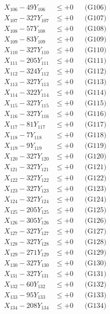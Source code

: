 \documentclass[a4paper,10pt]{article}
\begin{document}
{\begin{align}
X_{106} - 49Y_{106} &\leq +0 && \text{(G106)} \\
X_{107} - 327Y_{107} &\leq +0 && \text{(G107)} \\
X_{108} - 57Y_{108} &\leq +0 && \text{(G108)} \\
X_{109} - 83Y_{109} &\leq +0 && \text{(G109)} \\
X_{110} - 327Y_{110} &\leq +0 && \text{(G110)} \\
\allowbreak
X_{111} - 205Y_{111} &\leq +0 && \text{(G111)} \\
X_{112} - 324Y_{112} &\leq +0 && \text{(G112)} \\
X_{113} - 327Y_{113} &\leq +0 && \text{(G113)} \\
X_{114} - 322Y_{114} &\leq +0 && \text{(G114)} \\
X_{115} - 327Y_{115} &\leq +0 && \text{(G115)} \\
X_{116} - 327Y_{116} &\leq +0 && \text{(G116)} \\
X_{117} - 81Y_{117} &\leq +0 && \text{(G117)} \\
X_{118} - 7Y_{118} &\leq +0 && \text{(G118)} \\
X_{119} - 9Y_{119} &\leq +0 && \text{(G119)} \\
X_{120} - 327Y_{120} &\leq +0 && \text{(G120)} \\
\allowbreak
X_{121} - 327Y_{121} &\leq +0 && \text{(G121)} \\
X_{122} - 327Y_{122} &\leq +0 && \text{(G122)} \\
X_{123} - 327Y_{123} &\leq +0 && \text{(G123)} \\
X_{124} - 327Y_{124} &\leq +0 && \text{(G124)} \\
X_{125} - 205Y_{125} &\leq +0 && \text{(G125)} \\
X_{126} - 305Y_{126} &\leq +0 && \text{(G126)} \\
X_{127} - 327Y_{127} &\leq +0 && \text{(G127)} \\
X_{128} - 327Y_{128} &\leq +0 && \text{(G128)} \\
X_{129} - 271Y_{129} &\leq +0 && \text{(G129)} \\
X_{130} - 327Y_{130} &\leq +0 && \text{(G130)} \\
\allowbreak
X_{131} - 327Y_{131} &\leq +0 && \text{(G131)} \\
X_{132} - 60Y_{132} &\leq +0 && \text{(G132)} \\
X_{133} - 95Y_{133} &\leq +0 && \text{(G133)} \\
X_{134} - 208Y_{134} &\leq +0 && \text{(G134)} \\

\end{align}}
\end{document}
